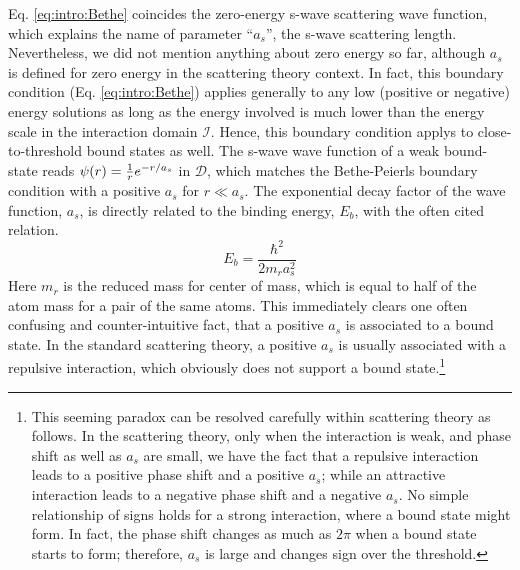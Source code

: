 Eq. \ref{eq:intro:Bethe} coincides the zero-energy s-wave scattering wave function, which explains the name of parameter ``$a_s$'', the s-wave scattering length. Nevertheless,    we did not mention anything about zero energy so far, although $a_{s}$ is defined for zero energy in the scattering theory context.  In fact,  this boundary condition (Eq. \ref{eq:intro:Bethe}) applies generally to  any low (positive or negative) energy solutions as long as the energy involved is much lower than the energy scale in the interaction domain $\mathcal{I}$.  Hence, this boundary condition applys  to close-to-threshold bound states as well.  The s-wave wave function of a weak bound-state reads $\psi(r)=\frac{1}{r}e^{-r/a_s}$ in $\mathcal{D}$, which matches the Bethe-Peierls boundary condition with a positive $a_{s}$ for  $r\ll{}a_{s}$. The exponential decay factor of the wave function, $a_{s}$, is directly related to the binding energy, $E_{b}$, with the often cited relation.
\begin{equation}
 E_{b}=\frac{\hbar^{2}}{2m_{r}a_{s}^{2}}
\end{equation}
Here $m_{r}$ is the reduced mass for center of mass, which is equal to half of the atom mass for a pair of the same atoms.  This immediately clears one often confusing and counter-intuitive fact, that a positive  $a_s$ is associated to a bound state.  In the standard scattering theory, a positive $a_s$  is usually associated with a repulsive interaction, which obviously does not support a bound state.\footnote{This seeming paradox can be resolved carefully within scattering theory as follows. In the scattering theory, only when the interaction is weak, and phase shift as well as $a_s$ are small, we have the fact that a repulsive interaction leads to a positive phase shift and a positive $a_s$; while an attractive interaction leads to a negative phase shift and a negative $a_s$.  No simple relationship of signs holds for a strong interaction, where a bound state might form.  In fact, the phase shift changes as much as $2\pi$ when a bound state starts to form; therefore, $a_s$ is large and  changes sign over the threshold. }

